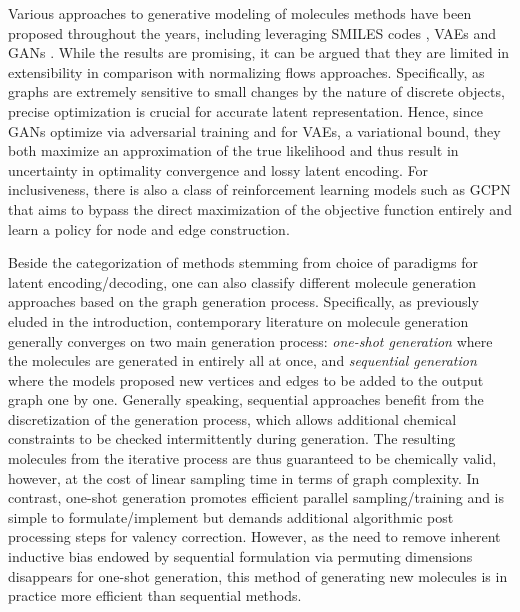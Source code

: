 Various approaches to generative modeling of molecules methods have been
proposed throughout the years, including leveraging SMILES codes
\citep{weiningerSMILESAlgorithmGeneration2002}, VAEs
\citep{jinJunctionTreeVariational2018, bressonTwoStepGraphConvolutional2019,
daiSyntaxDirectedVariationalAutoencoder2018,
simonovskyGraphVAEGenerationSmall2018} and GANs
\citep{decaoMolGANImplicitGenerative2018, youGraphConvolutionalPolicy2018}.
While the results are promising, it can be argued that they are limited in
extensibility in comparison with normalizing flows approaches. Specifically, as
graphs are extremely sensitive to small changes by the nature of discrete
objects, precise optimization is crucial for accurate latent representation.
Hence, since GANs optimize via adversarial training and for VAEs, a variational
bound, they both maximize an approximation of the true likelihood and thus
result in uncertainty in optimality convergence and lossy latent encoding. For
inclusiveness, there is also a class of reinforcement learning models such as
GCPN \citep{youGraphConvolutionalPolicy2018,
jinMultiObjectiveMoleculeGeneration2020,
wangMulticonstraintMolecularGeneration2021} that aims to bypass the direct
maximization of the objective function entirely and learn a policy for node and
edge construction.


Beside the categorization of methods stemming from choice of paradigms for
latent encoding/decoding, one can also classify different molecule generation
approaches based on the graph generation process. Specifically, as previously
eluded in the introduction, contemporary literature on molecule generation
generally converges on two main generation process: \textit{one-shot generation}
where the molecules are generated in entirely all at once, and
\textit{sequential generation} where the models proposed new vertices and edges
to be added to the output graph one by one. Generally speaking, sequential
approaches benefit from the discretization of the generation process, which
allows additional chemical constraints to be checked intermittently during
generation. The resulting molecules from the iterative process are thus
guaranteed to be chemically valid, however, at the cost of linear sampling time
in terms of graph complexity. In contrast, one-shot generation promotes
efficient parallel sampling/training and is simple to formulate/implement but
demands additional algorithmic post processing steps for valency correction.
However, as the need to remove inherent inductive bias endowed by sequential
formulation via permuting dimensions disappears for one-shot generation, this
method of generating new molecules is in practice more efficient than sequential
methods.

